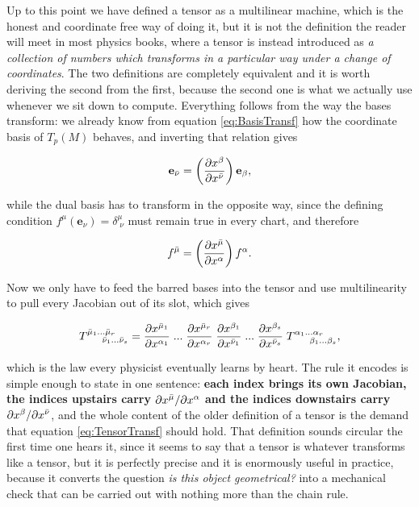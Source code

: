         Up to this point we have defined a tensor as a multilinear machine, which is the honest and coordinate free way of doing it, but it is not the definition the reader will meet in most physics books, where a tensor is instead introduced as \textit{a collection of numbers which transforms in a particular way under a change of coordinates}. The two definitions are completely equivalent and it is worth deriving the second from the first, because the second one is what we actually use whenever we sit down to compute. Everything follows from the way the bases transform: we already know from equation \ref{eq:BasisTransf} how the coordinate basis of $T_p(M)$ behaves, and inverting that relation gives

        \begin{equation}\label{eq:BasisTransfInv}
            \mathbf{e}_{\Bar{\nu}} = \left(\frac{\partial x^{\beta}}{\partial x^{\Bar{\nu}}}\right)\mathbf{e}_{\beta},
        \end{equation}

        while the dual basis has to transform in the opposite way, since the defining condition $f^{\mu}(\mathbf{e}_{\nu}) = \delta^{\mu}_{\;\nu}$ must remain true in every chart, and therefore

        \begin{equation}\label{eq:DualBasisTransf}
            f^{\Bar{\mu}} = \left(\frac{\partial x^{\Bar{\mu}}}{\partial x^{\alpha}}\right)f^{\alpha}.
        \end{equation}

        Now we only have to feed the barred bases into the tensor and use multilinearity to pull every Jacobian out of its slot, which gives

        \begin{equation}\label{eq:TensorTransf}
            T^{\Bar{\mu}_1...\Bar{\mu}_r}_{\quad\;\;\Bar{\nu}_1...\Bar{\nu}_s} = \frac{\partial x^{\Bar{\mu}_1}}{\partial x^{\alpha_1}}\;...\;\frac{\partial x^{\Bar{\mu}_r}}{\partial x^{\alpha_r}}\;\frac{\partial x^{\beta_1}}{\partial x^{\Bar{\nu}_1}}\;...\;\frac{\partial x^{\beta_s}}{\partial x^{\Bar{\nu}_s}}\;T^{\alpha_1...\alpha_r}_{\quad\;\;\beta_1...\beta_s},
        \end{equation}

        which is the law every physicist eventually learns by heart. The rule it encodes is simple enough to state in one sentence: \textbf{each index brings its own Jacobian, the indices upstairs carry $\partial x^{\Bar{\mu}}/\partial x^{\alpha}$ and the indices downstairs carry $\partial x^{\beta}/\partial x^{\Bar{\nu}}$}, and the whole content of the older definition of a tensor is the demand that equation \ref{eq:TensorTransf} should hold. That definition sounds circular the first time one hears it, since it seems to say that a tensor is whatever transforms like a tensor, but it is perfectly precise and it is enormously useful in practice, because it converts the question \textit{is this object geometrical?} into a mechanical check that can be carried out with nothing more than the chain rule.

